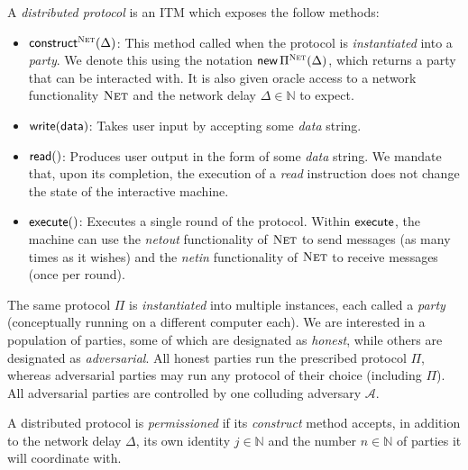 \begin{definition}
  A \emph{distributed protocol} is an ITM which exposes the follow methods:

  \begin{itemize}
    \item $\textsf{construct}^\textsc{Net}(\Delta)$:
          This method called when the protocol is \emph{instantiated} into a
          \emph{party}. We denote this using the notation $\textsf{new}\,\Pi^\textsc{Net}(\Delta)$,
          which returns a party that can be interacted with.
          It is also given oracle access to a network functionality
          $\textsc{Net}$ and the network delay $\Delta \in \mathbb{N}$ to expect.
    \item $\textsf{write}(\textsf{data})$:
          Takes user input by accepting some \emph{data} string.
    \item $\textsf{read}()$:
          Produces user output in the form of some \emph{data} string.
          We mandate that,
          upon its completion, the execution of a \emph{read} instruction
          does not change the state of the interactive machine.
    \item $\textsf{execute}()$:
          Executes a single round of the protocol.
          Within $\textsf{execute}$, the machine can
          use the \emph{netout} functionality of $\textsc{Net}$ to send messages
          (as many times as it wishes)
          and the \emph{netin} functionality of $\textsc{Net}$ to receive messages
          (once per round).
  \end{itemize}
\end{definition}

The same protocol $\Pi$ is \emph{instantiated} into multiple instances,
each called a \emph{party} (conceptually running on a different computer each).
We are interested in a population of parties, some of which are designated
as \emph{honest}, while others are designated as \emph{adversarial}.
All honest parties run the prescribed protocol $\Pi$, whereas adversarial
parties may run any protocol of their choice (including $\Pi$).
All adversarial parties are controlled by one colluding adversary $\mathcal{A}$.

\begin{definition}
  A distributed protocol is \emph{permissioned} if its \emph{construct}
  method accepts, in addition to the network delay $\Delta$,
  its own identity $j \in \mathbb{N}$
  and the number $n \in \mathbb{N}$ of parties it will coordinate with.
\end{definition}

